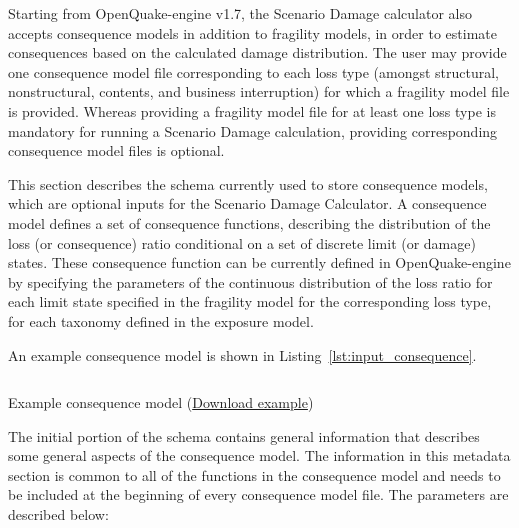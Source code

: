 Starting from OpenQuake-engine v1.7, the Scenario Damage calculator also
accepts \glspl{consequence model} in addition to \glspl{fragility model}, in
order to estimate consequences based on the calculated damage distribution.
The user may provide one \gls{consequence model} file corresponding to each
loss type (amongst structural, nonstructural, contents, and business
interruption) for which a fragility model file is provided. Whereas providing
a \gls{fragility model} file for at least one loss type is mandatory for
running a Scenario Damage calculation, providing corresponding
\gls{consequence model} files is optional.

This section describes the schema currently used to store \glspl{consequence
model}, which are optional inputs for the Scenario Damage Calculator. A
\gls{consequence model} defines a set of \glspl{consequence function},
describing the distribution of the loss (or consequence) ratio conditional on
a set of discrete limit (or damage) states. These \gls{consequence function}
can be currently defined in OpenQuake-engine by specifying the parameters of
the continuous distribution of the loss ratio for each limit state specified
in the fragility model for the corresponding loss type, for each taxonomy
defined in the exposure model.

An example consequence model is shown in Listing~\ref{lst:input_consequence}.

\begin{listing}[htbp]
  \inputminted[firstline=1,firstnumber=1,fontsize=\footnotesize,frame=single,linenos,bgcolor=lightgray]{xml}{oqum/risk/Verbatim/input_consequence.xml}
  \caption{Example consequence model (\href{https://raw.githubusercontent.com/GEMScienceTools/oq-engine-docs/master/oqum/risk/verbatim/input_consequence.xml}{Download example})}
  \label{lst:input_consequence}
\end{listing}	

The initial portion of the schema contains general information that describes
some general aspects of the \gls{consequence model}. The information in this
metadata section is common to all of the functions in the \gls{consequence
model} and needs to be included at the beginning of every \gls{consequence
model} file. The parameters are described below:

